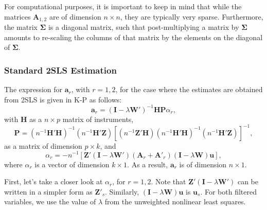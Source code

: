 \documentclass{article}
\begin{document}
For computational purposes, it is important to keep in mind that while the matrices
$\mathbf{A}_{1,2}$ are of dimension $n \times n$, they are typically very sparse.
Furthermore, the matrix $\mathbf{\Sigma}$ is a diagonal matrix, such that post-multiplying a matrix by
$\mathbf{\Sigma}$ amounts to re-scaling the columns of that matrix by the elements on the diagonal
of $\mathbf{\Sigma}$.

\subsubsection{Standard 2SLS Estimation}\label{ss:weightsstandard}
The expression for $\mathbf{a}_r$, with $r = 1,2$, for the case where the estimates
are obtained from 2SLS is given in K-P as follows:
\begin{equation}\label{eq:arstandard}
\mathbf{a}_r = (\mathbf{I} - \lambda \mathbf{W'} )^{-1} \mathbf{HP} \alpha_r,
\end{equation}
with $\mathbf{H}$ as a $n \times p$ matrix of instruments, 
\begin{equation}\label{eq:Pstandard}
\mathbf{P} = (n^{-1}\mathbf{H'H})^{-1} ( n^{-1} \mathbf{H'Z} ) 
        [ (n^{-1} \mathbf{Z'H} ) (n^{-1} \mathbf{H'H} )^{-1} (n^{-1} \mathbf{H'Z}) ]^{-1},
\end{equation}
as a matrix of dimension $p \times k$, and
\begin{equation*}
\alpha_r = - n^{-1} [ \mathbf{Z'} (\mathbf{I} - \lambda \mathbf{W'}) (\mathbf{A}_r + \mathbf{A'}_r) 
 ( \mathbf{I} - \lambda \mathbf{W} ) \mathbf{u} ],
\end{equation*}
where $\alpha_r$ is a vector of dimension $k \times 1$. As a result, $\mathbf{a}_r$ is of
dimension $n \times 1$.

First, let's take a closer look at $\alpha_r$, for $r = 1,2$. Note that $\mathbf{Z'} (\mathbf{I} - \lambda \mathbf{W'})$ can be written in a simpler form as $\mathbf{Z'}_s$. Similarly, 
$ ( \mathbf{I} - \lambda \mathbf{W} ) \mathbf{u}$ is $\mathbf{u}_s$. For both filtered variables,
we use the value of $\lambda$ from the unweighted nonlinear least squares.
\end{document}
